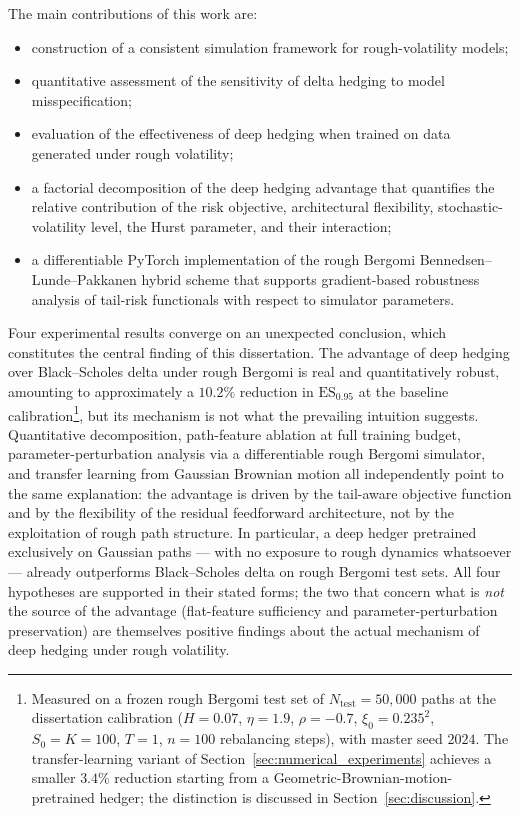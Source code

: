 \documentclass[12pt,a4paper]{article}
\theoremstyle{definition}
\theoremstyle{plain}
\theoremstyle{remark}
\theoremstyle{plain}
\begin{document}
The main contributions of this work are:
\begin{itemize}
    \item construction of a consistent simulation framework for rough-volatility models;
    \item quantitative assessment of the sensitivity of delta hedging to model misspecification;
    \item evaluation of the effectiveness of deep hedging when trained on data generated under rough volatility;
    \item a factorial decomposition of the deep hedging advantage that quantifies the relative contribution of the risk objective, architectural flexibility, stochastic-volatility level, the Hurst parameter, and their interaction;
    \item a differentiable PyTorch implementation of the rough Bergomi Bennedsen--Lunde--Pakkanen hybrid scheme that supports gradient-based robustness analysis of tail-risk functionals with respect to simulator parameters.
\end{itemize}

Four experimental results converge on an unexpected conclusion, which constitutes the central finding of this dissertation. The advantage of deep hedging over Black--Scholes delta under rough Bergomi is real and quantitatively robust, amounting to approximately a $10.2\%$ reduction in $\mathrm{ES}_{0.95}$ at the baseline calibration\footnote{Measured on a frozen rough Bergomi test set of $N_{\mathrm{test}} = 50{,}000$ paths at the dissertation calibration ($H=0.07$, $\eta=1.9$, $\rho=-0.7$, $\xi_0 = 0.235^2$, $S_0 = K = 100$, $T=1$, $n=100$ rebalancing steps), with master seed $2024$. The transfer-learning variant of Section~\ref{sec:numerical_experiments} achieves a smaller $3.4\%$ reduction starting from a Geometric-Brownian-motion-pretrained hedger; the distinction is discussed in Section~\ref{sec:discussion}.}, but its mechanism is not what the prevailing intuition suggests. Quantitative decomposition, path-feature ablation at full training budget, parameter-perturbation analysis via a differentiable rough Bergomi simulator, and transfer learning from Gaussian Brownian motion all independently point to the same explanation: the advantage is driven by the tail-aware objective function and by the flexibility of the residual feedforward architecture, not by the exploitation of rough path structure. In particular, a deep hedger pretrained exclusively on Gaussian paths --- with no exposure to rough dynamics whatsoever --- already outperforms Black--Scholes delta on rough Bergomi test sets. All four hypotheses are supported in their stated forms; the two that concern what is \emph{not} the source of the advantage (flat-feature sufficiency and parameter-perturbation preservation) are themselves positive findings about the actual mechanism of deep hedging under rough volatility.
\end{document}

